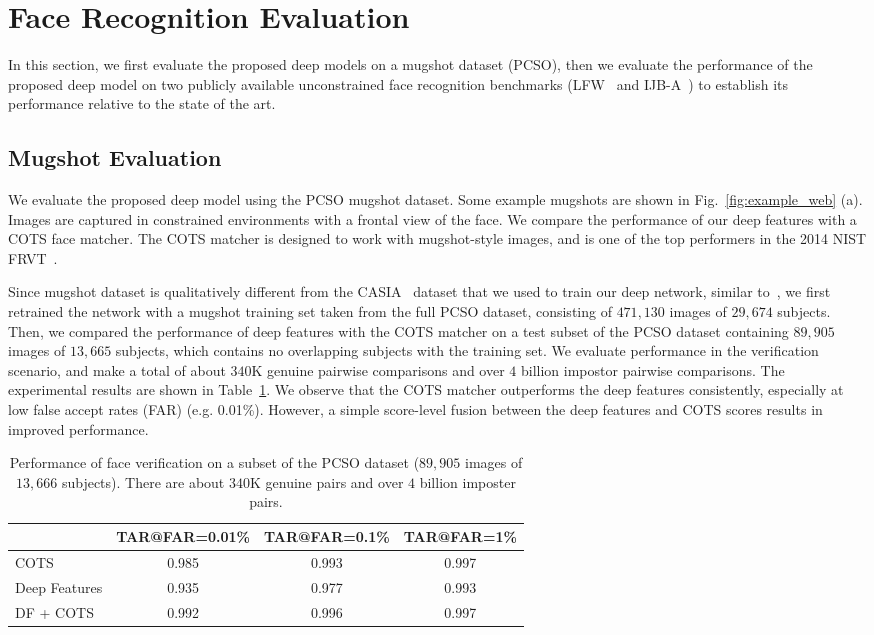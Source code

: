 \documentclass[10pt,journal,compsoc]{IEEEtran}
\begin{document}
\section{Face Recognition Evaluation}
In this section, we first evaluate the proposed deep models on a mugshot dataset (PCSO), then we evaluate the performance of the proposed deep model on two publicly available unconstrained face recognition benchmarks (LFW~\cite{DB:LFWTech} and IJB-A~\cite{db:janus}) to establish its performance relative to the state of the art.

\subsection{Mugshot Evaluation}
We evaluate the proposed deep model using the PCSO mugshot dataset. Some example mugshots are shown in Fig.~\ref{fig:example_web} (a). Images are captured in constrained environments with a frontal view of the face. We compare the performance of our deep features with a COTS face matcher. The COTS matcher is designed to work with mugshot-style images, and is one of the top performers in the 2014 NIST FRVT~\cite{fvrt:2014}.

Since mugshot dataset is qualitatively different from the CASIA~\cite{db:janus} dataset that we used to train our deep network, similar to~\cite{icb2015}, we first retrained the network with a mugshot training set taken from the full PCSO dataset, consisting of $471,130$ images of $29,674$ subjects. Then, we compared the performance of deep features with the COTS matcher on a test subset of the PCSO dataset containing $89,905$ images of $13,665$ subjects, which contains no overlapping subjects with the training set. We evaluate performance in the verification scenario, and make a total of about $340$K genuine pairwise comparisons and over $4$ billion impostor pairwise comparisons. The experimental results are shown in Table~\ref{tab:pcso}. We observe that the COTS matcher outperforms the deep features consistently, especially at low false accept rates (FAR) (e.g. 0.01\%). However, a simple score-level fusion between the deep features and COTS scores results in improved performance.

\begin{table}[htbp]
\scriptsize
\centering
\caption{Performance of face verification on a subset of the PCSO dataset ($89,905$ images of $13,666$ subjects). There are about $340$K genuine pairs and over $4$ billion imposter pairs.}\label{tab:pcso}
\begin{tabular}{l|ccc}
\toprule
              & TAR@FAR=0.01\% & TAR@FAR=0.1\% & TAR@FAR=1\%\\ \midrule
COTS          & 0.985    & 0.993     & 0.997 \\
Deep Features & 0.935    & 0.977     & 0.993 \\ \cmidrule{1-1}
DF + COTS     & 0.992    & 0.996     & 0.997 \\
\bottomrule
\end{tabular}
\end{table}
\end{document}

